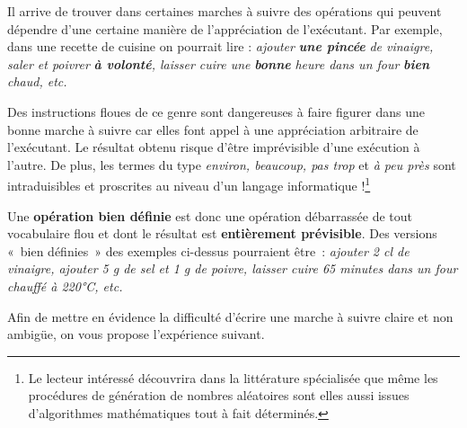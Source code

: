 		Il arrive de trouver dans certaines marches à suivre des opérations qui
		peuvent dépendre d’une certaine manière de l’appréciation de
		l’exécutant. Par exemple, dans une recette de cuisine on pourrait lire
		: \textit{ajouter }\textbf{\textit{une pincée }}\textit{de vinaigre,
		saler et poivrer }\textbf{\textit{à volonté}}\textit{, laisser cuire
		une }\textbf{\textit{bonne}}\textit{ heure dans un four
		}\textbf{\textit{bien}}\textit{ chaud, etc.}
		
		Des instructions floues de ce genre sont dangereuses à faire figurer
		dans une bonne marche à suivre car elles font appel à une appréciation
		arbitraire de l'exécutant. Le résultat obtenu risque
		d’être imprévisible d’une exécution à l’autre. De plus, les termes du
		type \textit{environ, beaucoup, pas trop} et \textit{à peu près }sont
		intraduisibles et proscrites au niveau d’un langage informatique
		!\footnote{Le lecteur intéressé découvrira dans la littérature
		spécialisée que même les procédures de génération de nombres aléatoires
		sont elles aussi issues d’algorithmes mathématiques tout à fait
		déterminés.}
		
		Une \textbf{opération bien définie} est donc une opération débarrassée
		de tout vocabulaire flou et dont le résultat est \textbf{entièrement
		prévisible}. Des versions «~bien définies~» des exemples ci-dessus
		pourraient être~: \textit{ajouter 2 cl de vinaigre, ajouter 5 g de sel
		et 1 g de poivre, laisser cuire 65 minutes dans un four chauffé à
		220°C, etc.}

		Afin de mettre en évidence la difficulté d'écrire une
		marche à suivre claire et non ambigüe, on vous propose
		l'expérience suivant.


